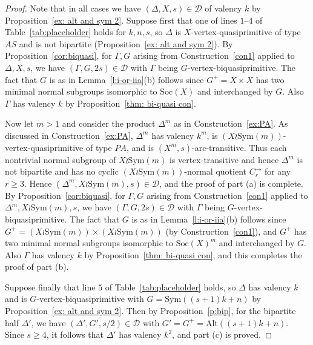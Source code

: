 \documentclass[11pt]{amsart}
\newcommand{\Soc}{\mathrm{Soc}}
\newcommand\DD{{\mathscr{D}}}
\newcommand{\Sym}{\mathrm{Sym}}
\newcommand{\Alt}{\mathrm{Alt}}
\begin{document}
\begin{proof}
Note that in all cases we have $(\Delta, X, s)\in\DD$ of valency $k$ by Proposition~\ref{ex: alt and sym 2}. 
Suppose first that one of lines $1$--$4$  of Table~\ref{tab:placeholder} holds for $k,n,s$, so 
$\Delta$ is $X$-vertex-quasiprimitive of type $AS$ and is not bipartite (Proposition~\ref{ex: alt and sym 2}). By Proposition~\ref{cor:biquasi}, for $\Gamma, G$ arising from Construction~\ref{con1} applied to $\Delta, X, s$, we have $(\Gamma,G,2s)\in\DD$ with $\Gamma$ being $G$-vertex-biquasiprimitive. The fact that $G$ is as in Lemma~\ref{l:i-or-iia}(b) follows since $G^+=X\times X$ has two minimal normal subgroups isomorphic to $\Soc(X)$ and interchanged by $G$. Also $\Gamma$ has valency $k$ by Proposition~\ref{thm: bi-quasi con}.

Now let $m>1$ and consider the product $\Delta^m$ as in Construction~\ref{ex:PA}. As discussed in Construction~\ref{ex:PA}, $\Delta^m$ has valency $k^m$, is $(X\wr \Sym(m))$-vertex-quasiprimitive of type $PA$, and is $(X^m,s)$-arc-transitive. Thus each nontrivial normal subgroup of $X\wr \Sym(m)$ is vertex-transitive and hence $\Delta^m$ is not bipartite and has no cyclic $(X\wr \Sym(m))$-normal quotient $C_r^\to$ for any $r\geq 3$. 
Hence  $(\Delta^m, X\wr \Sym(m),s)\in\DD$, and the proof of part (a) is complete. By Proposition~\ref{cor:biquasi}, for $\Gamma, G$ arising from Construction~\ref{con1} applied to $\Delta^m, X\wr \Sym(m),s$, we have $(\Gamma,G,2s)\in\DD$ with $\Gamma$ being $G$-vertex-biquasiprimitive. The fact that $G$ is as in Lemma~\ref{l:i-or-iia}(b) follows since $G^+=(X\wr \Sym(m))\times (X\wr \Sym(m))$ (by Construction~\ref{con1}), and $G^+$ has two minimal normal subgroups isomorphic to $\Soc(X)^m$ and interchanged by $G$. Also $\Gamma$ has valency $k$ by Proposition~\ref{thm: bi-quasi con}, and this completes the proof of part (b).

Suppose finally that line $5$ of Table~\ref{tab:placeholder} holds, so $\Delta$ has valency $k$ and is $G$-vertex-biquasiprimitive with $G=\Sym((s+1)k+n)$ by Proposition~\ref{ex: alt and sym 2}. Then by Proposition~\ref{p:bip}, for the bipartite half $\Delta'$, we have  $(\Delta', G',s/2)\in\DD$ with $G'=G^+=\Alt((s+1)k+n)$. Since $s\geq4$, it follows that $\Delta'$ has valency $k^2$, and part (c) is proved.
\end{proof}


\end{document}
